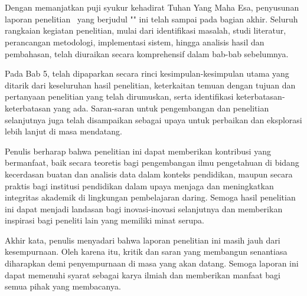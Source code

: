 \chapter{\kesimpulan} %
\label{bab:6} %
Dengan memanjatkan puji syukur kehadirat Tuhan Yang Maha Esa, penyusunan laporan penelitian \type\ yang berjudul "\judul" ini telah sampai pada bagian akhir. Seluruh rangkaian kegiatan penelitian, mulai dari identifikasi masalah, studi literatur, perancangan metodologi, implementasi sistem, hingga analisis hasil dan pembahasan, telah diuraikan secara komprehensif dalam bab-bab sebelumnya.

Pada Bab 5, telah dipaparkan secara rinci kesimpulan-kesimpulan utama yang ditarik dari keseluruhan hasil penelitian, keterkaitan temuan dengan tujuan dan pertanyaan penelitian yang telah dirumuskan, serta identifikasi keterbatasan-keterbatasan yang ada. Saran-saran untuk pengembangan dan penelitian selanjutnya juga telah disampaikan sebagai upaya untuk perbaikan dan eksplorasi lebih lanjut di masa mendatang.

Penulis berharap bahwa penelitian ini dapat memberikan kontribusi yang bermanfaat, baik secara teoretis bagi pengembangan ilmu pengetahuan di bidang kecerdasan buatan dan analisis data dalam konteks pendidikan, maupun secara praktis bagi institusi pendidikan dalam upaya menjaga dan meningkatkan integritas akademik di lingkungan pembelajaran daring. Semoga hasil penelitian ini dapat menjadi landasan bagi inovasi-inovasi selanjutnya dan memberikan inspirasi bagi peneliti lain yang memiliki minat serupa.

Akhir kata, penulis menyadari bahwa laporan penelitian ini masih jauh dari kesempurnaan. Oleh karena itu, kritik dan saran yang membangun senantiasa diharapkan demi penyempurnaan di masa yang akan datang. Semoga laporan ini dapat memenuhi syarat sebagai karya ilmiah dan memberikan manfaat bagi semua pihak yang membacanya.